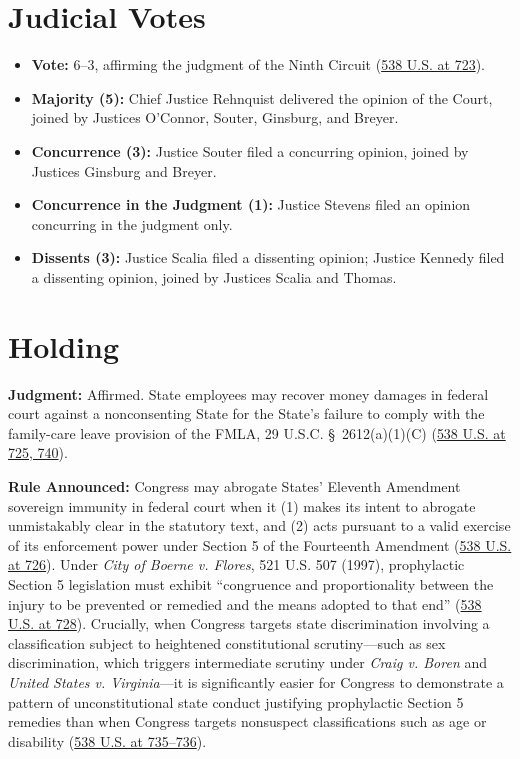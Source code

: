 \documentclass[12pt]{article}
\begin{document}
\section{Judicial Votes}
\begin{itemize}
\item \textbf{Vote:} 6--3, affirming the judgment of the Ninth Circuit (\href{https://supreme.justia.com/cases/federal/us/538/721/}{538 U.S. at 723}).
\item \textbf{Majority (5):} Chief Justice Rehnquist delivered the opinion of the Court, joined by Justices O'Connor, Souter, Ginsburg, and Breyer.
\item \textbf{Concurrence (3):} Justice Souter filed a concurring opinion, joined by Justices Ginsburg and Breyer.
\item \textbf{Concurrence in the Judgment (1):} Justice Stevens filed an opinion concurring in the judgment only.
\item \textbf{Dissents (3):} Justice Scalia filed a dissenting opinion; Justice Kennedy filed a dissenting opinion, joined by Justices Scalia and Thomas.
\end{itemize}

\section{Holding}
\textbf{Judgment:} Affirmed. State employees may recover money damages in federal court against a nonconsenting State for the State's failure to comply with the family-care leave provision of the FMLA, 29 U.S.C. \S~2612(a)(1)(C) (\href{https://supreme.justia.com/cases/federal/us/538/721/}{538 U.S. at 725, 740}).

\textbf{Rule Announced:} Congress may abrogate States' Eleventh Amendment sovereign immunity in federal court when it (1) makes its intent to abrogate unmistakably clear in the statutory text, and (2) acts pursuant to a valid exercise of its enforcement power under Section 5 of the Fourteenth Amendment (\href{https://supreme.justia.com/cases/federal/us/538/721/}{538 U.S. at 726}). Under \textit{City of Boerne v. Flores}, 521 U.S. 507 (1997), prophylactic Section 5 legislation must exhibit ``congruence and proportionality between the injury to be prevented or remedied and the means adopted to that end'' (\href{https://supreme.justia.com/cases/federal/us/538/721/}{538 U.S. at 728}). Crucially, when Congress targets state discrimination involving a classification subject to heightened constitutional scrutiny---such as sex discrimination, which triggers intermediate scrutiny under \textit{Craig v. Boren} and \textit{United States v. Virginia}---it is significantly easier for Congress to demonstrate a pattern of unconstitutional state conduct justifying prophylactic Section 5 remedies than when Congress targets nonsuspect classifications such as age or disability (\href{https://supreme.justia.com/cases/federal/us/538/721/}{538 U.S. at 735--736}).
\end{document}
